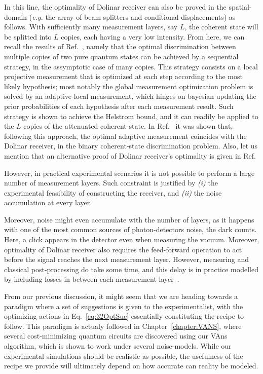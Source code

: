 In this line, the optimality of Dolinar receiver can also be proved in the spatial-domain (\textit{e.g.} the array of beam-splitters and conditional displacements) as follows. With sufficiently many measurement layers, say $L$, the coherent state will be splitted into $L$ copies, each having a very low intensity. From here, we can recall the results of Ref.~\cite{Acin2005Multi}, namely that the optimal discrimination between multiple copies of two pure quantum states can be achieved by a sequential strategy, in the assymptotic case of many copies. This strategy consists on a local projective measurement that is optimized at each step according to the most likely hypothesis; most notably the global measurement optimization problem is solved by an adaptive-local measurement, which hinges on bayesian updating the prior probabilities of each hypothesis after each measurement result. Such strategy is shown to achieve the Helstrom bound, and it can readily be applied to the $L$ copies of the attenuated coherent-state. In Ref.~\cite{revisiting2011Assalini} it was shown that, following this approach, the optimal adaptive measurement coincides with the Dolinar receiver, in the binary coherent-state discrimination problem. Also, let us mention that an alternative proof of Dolinar receiver's optimality is given in Ref.~\cite{Takeoka2005}

\bigskip
However, in practical experimental scenarios it is not possible to perform a large number of measurement layers. Such constraint is justified by \textit{(i)} the experimental feasibility of constructing the receiver, and \textit{(ii)} the noise accumulation at every layer.

Moreover, noise might even accumulate with the number of layers, as it happens with one of the most common sources of photon-detectors noise, the dark counts. Here, a click appears in the detector even when measuring the vacuum. Moreover, optimality of Dolinar receiver also requires the feed-forward operation to act before the signal reaches the next measurement layer. However, measuring and classical post-processing do take some time, and this delay is in practice modelled by including losses in between each measurement layer~\cite{sychLeuchs}.

From our previous discussion, it might seem that we are heading towards a paradigm where a set of suggestions is given to the experimentalist, with the optimizing actions in Eq.~\ref{eq:32OptSuc} essentially constituting the recipe to follow. This paradigm is actualy followed in Chapter~\ref{chapter:VANS}, where several cost-minimizing quantum circuits are discovered using our VAns algorithm, which is shown to work under several noise-models. While our experimental simulations should be realistic as possible, the usefulness of the recipe we provide will ultimately depend on how accurate can reality be modeled.

